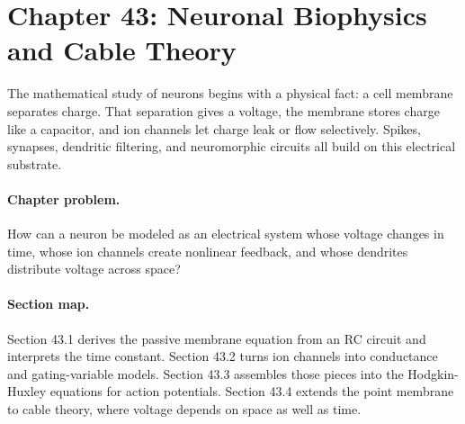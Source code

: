 \section{Chapter 43: Neuronal Biophysics and Cable Theory}
\label{ch:neuronal-biophysics-cable-theory}

The mathematical study of neurons begins with a physical fact: a cell membrane separates charge. That separation gives a voltage, the membrane stores charge like a capacitor, and ion channels let charge leak or flow selectively. Spikes, synapses, dendritic filtering, and neuromorphic circuits all build on this electrical substrate.

\paragraph{Chapter problem.}
How can a neuron be modeled as an electrical system whose voltage changes in time, whose ion channels create nonlinear feedback, and whose dendrites distribute voltage across space?

\paragraph{Section map.}
Section 43.1 derives the passive membrane equation from an RC circuit and interprets the time constant. Section 43.2 turns ion channels into conductance and gating-variable models. Section 43.3 assembles those pieces into the Hodgkin-Huxley equations for action potentials. Section 43.4 extends the point membrane to cable theory, where voltage depends on space as well as time.

